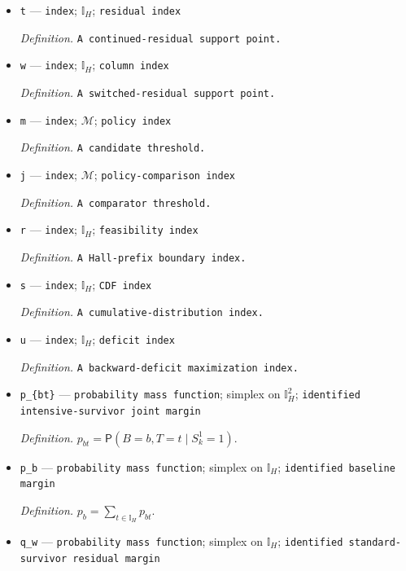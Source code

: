\documentclass{article}
\begin{document}
\begin{itemize}
  \item \texttt{t} --- \texttt{index}; \(\mathbb I_H\); \texttt{residual index}
  \par\smallskip\noindent\emph{Definition.} \texttt{A continued-\allowbreak{}residual support point.}
  \item \texttt{w} --- \texttt{index}; \(\mathbb I_H\); \texttt{column index}
  \par\smallskip\noindent\emph{Definition.} \texttt{A switched-\allowbreak{}residual support point.}
  \item \texttt{m} --- \texttt{index}; \(\mathcal M\); \texttt{policy index}
  \par\smallskip\noindent\emph{Definition.} \texttt{A candidate threshold.}
  \item \texttt{j} --- \texttt{index}; \(\mathcal M\); \texttt{policy-\allowbreak{}comparison index}
  \par\smallskip\noindent\emph{Definition.} \texttt{A comparator threshold.}
  \item \texttt{r} --- \texttt{index}; \(\mathbb I_H\); \texttt{feasibility index}
  \par\smallskip\noindent\emph{Definition.} \texttt{A Hall-\allowbreak{}prefix boundary index.}
  \item \texttt{s} --- \texttt{index}; \(\mathbb I_H\); \texttt{CDF index}
  \par\smallskip\noindent\emph{Definition.} \texttt{A cumulative-\allowbreak{}distribution index.}
  \item \texttt{u} --- \texttt{index}; \(\mathbb I_H\); \texttt{deficit index}
  \par\smallskip\noindent\emph{Definition.} \texttt{A backward-\allowbreak{}deficit maximization index.}
  \item \texttt{p\_\allowbreak{}\{bt\}\allowbreak{}} --- \texttt{probability mass function}; simplex on \(\mathbb I_H^2\); \texttt{identified intensive-\allowbreak{}survivor joint margin}
  \par\smallskip\noindent\emph{Definition.} \(p_{bt}=\mathsf P(B=b,T=t\mid S_k^1=1)\).
  \item \texttt{p\_\allowbreak{}b} --- \texttt{probability mass function}; simplex on \(\mathbb I_H\); \texttt{identified baseline margin}
  \par\smallskip\noindent\emph{Definition.} \(p_b=\sum_{t\in\mathbb I_H}p_{bt}\).
  \item \texttt{q\_\allowbreak{}w} --- \texttt{probability mass function}; simplex on \(\mathbb I_H\); \texttt{identified standard-\allowbreak{}survivor residual margin}

\end{itemize}
\end{document}
